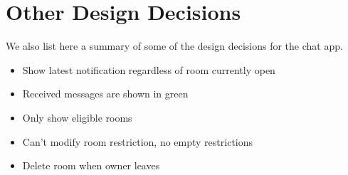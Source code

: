 \documentclass[letterpaper, 11pt]{article}
\begin{document}
\section{Other Design Decisions}
We also list here a summary of some of the design decisions for the chat app.
\begin{itemize}
\item Show latest notification regardless of room currently open
\item Received messages are shown in green
\item Only show eligible rooms
\item Can't modify room restriction, no empty restrictions
\item Delete room when owner leaves
\end{itemize}
\end{document}
